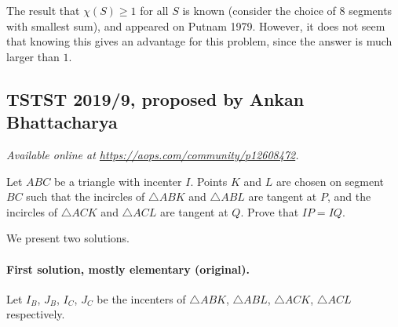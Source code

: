\documentclass[11pt]{scrartcl}
\begin{document}
\begin{remark*}
  The result that $\chi(S) \ge 1$ for all $S$ is known
  (consider the choice of $8$ segments with smallest sum),
  and appeared on Putnam 1979.
  However, it does not seem that knowing this
  gives an advantage for this problem,
  since the answer is much larger than $1$.
\end{remark*}
\pagebreak

\subsection{TSTST 2019/9, proposed by Ankan Bhattacharya}
\textsl{Available online at \url{https://aops.com/community/p12608472}.}
\begin{mdframed}[style=mdpurplebox,frametitle={Problem statement}]
Let $ABC$ be a triangle with incenter $I$.
Points $K$ and $L$ are chosen on segment $BC$
such that the incircles of $\triangle ABK$ and $\triangle ABL$ are tangent at $P$,
and the incircles of $\triangle ACK$ and $\triangle ACL$ are tangent at $Q$.
Prove that $IP = IQ$.
\end{mdframed}
We present two solutions.

\paragraph{First solution, mostly elementary (original).}
Let $I_B$, $J_B$, $I_C$, $J_C$ be the incenters
of $\triangle ABK$, $\triangle ABL$,
$\triangle ACK$, $\triangle ACL$ respectively.
\end{document}
